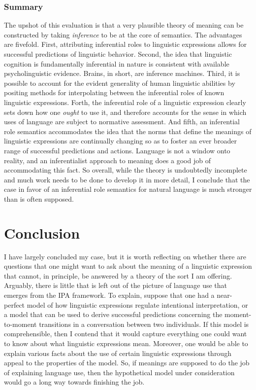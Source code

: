 \subsubsection{Summary}

The upshot of this evaluation is that a very plausible theory of meaning can be constructed by taking \textit{inference} to be at the core of semantics. The advantages are fivefold. First, attributing inferential roles to linguistic expressions allows for successful predictions of linguistic behavior. Second, the idea that linguistic cognition is fundamentally inferential in nature is consistent with available psycholinguistic evidence. Brains, in short, are inference machines. Third, it is possible to account for the evident generality of human linguistic abilities by positing methods for interpolating between the inferential roles of known linguistic expressions. Forth, the inferential role of a linguistic expression clearly sets down how one \textit{ought} to use it, and therefore accounts for the sense in which uses of language are subject to normative assessment. And fifth, an inferential role semantics accommodates the idea that the norms that define the meanings of linguistic expressions are continually changing so as to foster an ever broader range of successful predictions and actions. Language is not a window onto reality, and an inferentialist approach to meaning does a good job of accommodating this fact. So overall, while the theory is undoubtedly incomplete and much work needs to be done to develop it in more detail, I conclude that the case in favor of an inferential role semantics for natural language is much stronger than is often supposed. 

\section{Conclusion}

I have largely concluded my case, but it is worth reflecting on whether there are questions that one might want to ask about the meaning of a linguistic expression that cannot, in principle, be answered by a theory of the sort I am offering. Arguably, there is little that is left out of the picture of language use that emerges from the IPA framework. To explain, suppose that one had a near-perfect model of how linguistic expressions regulate intentional interpretation, or a model that can be used to derive successful predictions concerning the moment-to-moment transitions in a conversation between two individuals. If this model is comprehensible, then I contend that it would capture everything one could want to know about what linguistic expressions mean. Moreover, one would be able to explain various facts about the use of certain linguistic expressions through appeal to the properties of the model. So, if meanings are supposed to do the job of explaining language use, then the hypothetical model under consideration would go a long way towards finishing the job.

